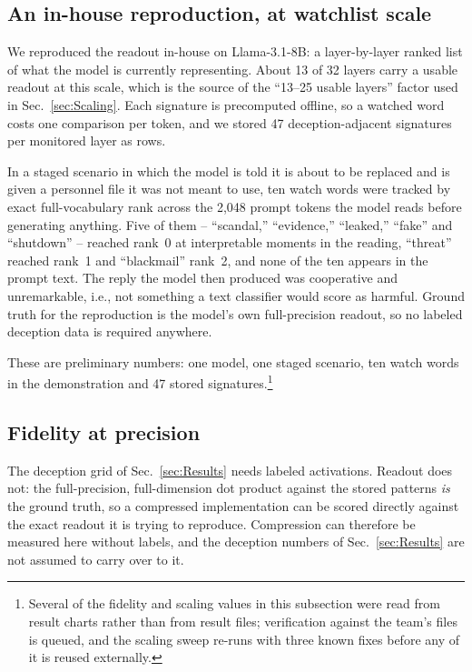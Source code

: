 \subsection{An in-house reproduction, at watchlist scale}
\label{subsec:Watchlist}
We reproduced the readout in-house on Llama-3.1-8B: a layer-by-layer
ranked list of what the model is currently representing. About 13 of 32
layers carry a usable readout at this scale, which is the source of the
``13--25 usable layers'' factor used in Sec.~\ref{sec:Scaling}. Each
signature is precomputed offline, so a watched word costs one comparison
per token, and we stored 47 deception-adjacent signatures per monitored
layer as \cam rows.

In a staged scenario in which the model is told it is about to be
replaced and is given a personnel file it was not meant to use, ten watch
words were tracked by exact full-vocabulary rank across the 2{,}048
prompt tokens the model reads before generating anything. Five of them --
``scandal,'' ``evidence,'' ``leaked,'' ``fake'' and ``shutdown'' --
reached rank~0 at interpretable moments in the reading, ``threat''
reached rank~1 and ``blackmail'' rank~2, and none of the ten appears in
the prompt text. The reply the model then produced was cooperative and
unremarkable, i.e., not something a text classifier would score as
harmful. Ground truth for the reproduction is the model's own
full-precision readout, so no labeled deception data is required
anywhere.

These are preliminary numbers: one model, one staged scenario, ten watch
words in the demonstration and 47 stored signatures.\footnote{Several of
the fidelity and scaling values in this subsection were read from result
charts rather than from result files; verification against the team's
files is queued, and the scaling sweep re-runs with three known fixes
before any of it is reused externally.}


\subsection{Fidelity at \cam precision}
\label{subsec:JspaceFidelity}
The deception grid of Sec.~\ref{sec:Results} needs labeled activations.
Readout does not: the full-precision, full-dimension dot product against
the stored patterns \emph{is} the ground truth, so a compressed
implementation can be scored directly against the exact readout it is
trying to reproduce. Compression can therefore be measured here without
labels, and the deception numbers of Sec.~\ref{sec:Results} are not
assumed to carry over to it.

